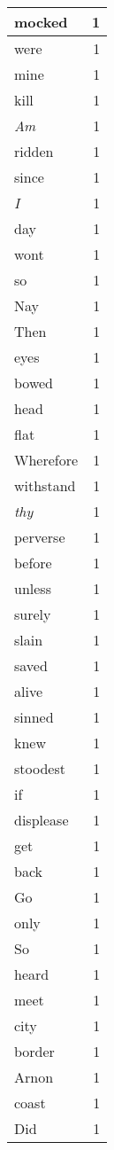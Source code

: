 \begin{center}
\begin{longtable}{l|r}
mocked & 1\\ \hline 
were & 1\\ \hline 
mine & 1\\ \hline 
kill & 1\\ \hline 
\emph{Am} & 1\\ \hline 
ridden & 1\\ \hline 
since & 1\\ \hline 
\emph{I} & 1\\ \hline 
day & 1\\ \hline 
wont & 1\\ \hline 
so & 1\\ \hline 
Nay & 1\\ \hline 
Then & 1\\ \hline 
eyes & 1\\ \hline 
bowed & 1\\ \hline 
head & 1\\ \hline 
flat & 1\\ \hline 
Wherefore & 1\\ \hline 
withstand & 1\\ \hline 
\emph{thy} & 1\\ \hline 
perverse & 1\\ \hline 
before & 1\\ \hline 
unless & 1\\ \hline 
surely & 1\\ \hline 
slain & 1\\ \hline 
saved & 1\\ \hline 
alive & 1\\ \hline 
sinned & 1\\ \hline 
knew & 1\\ \hline 
stoodest & 1\\ \hline 
if & 1\\ \hline 
displease & 1\\ \hline 
get & 1\\ \hline 
back & 1\\ \hline 
Go & 1\\ \hline 
only & 1\\ \hline 
So & 1\\ \hline 
heard & 1\\ \hline 
meet & 1\\ \hline 
city & 1\\ \hline 
border & 1\\ \hline 
Arnon & 1\\ \hline 
coast & 1\\ \hline 
Did & 1\\ \hline 

\end{longtable}
\end{center}
